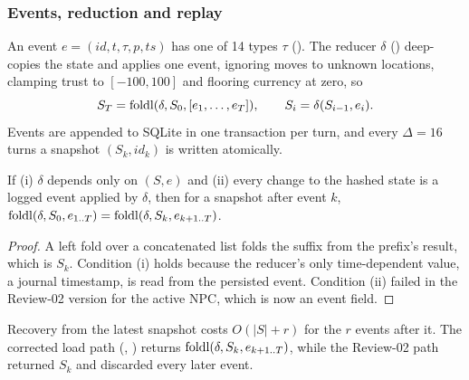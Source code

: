 \documentclass[letterpaper,journal]{IEEEtran}
\begin{document}
\subsubsection{Events, reduction and replay}
An event $e=(\mathit{id},t,\tau,p,\mathit{ts})$ has one of 14 types $\tau$ (). The reducer $\delta$ () deep-copies the state and applies one event, ignoring moves to unknown locations, clamping trust to $[-100,100]$ and flooring currency at zero, so
\begin{equation}\label{eq:fold}
S_{T}=\operatorname{foldl}(\delta,S_0,[e_1,\dots,e_T]),\qquad S_{i}=\delta(S_{i-1},e_i).
\end{equation}
Events are appended to SQLite in one transaction per turn, and every $\Delta=16$ turns a snapshot $(S_k,\mathit{id}_k)$ is written atomically.

\begin{proposition}\label{prop:replay}
If (i) $\delta$ depends only on $(S,e)$ and (ii) every change to the hashed state is a logged event applied by $\delta$, then for a snapshot after event $k$, $\operatorname{foldl}(\delta,S_0,e_{1..T})=\operatorname{foldl}(\delta,S_k,e_{k+1..T})$.
\end{proposition}
\begin{proof}
A left fold over a concatenated list folds the suffix from the prefix's result, which is $S_k$. Condition (i) holds because the reducer's only time-dependent value, a journal timestamp, is read from the persisted event. Condition (ii) failed in the Review-02 version for the active NPC, which is now an event field.
\end{proof}
Recovery from the latest snapshot costs $O(|S|+r)$ for the $r$ events after it. The corrected load path (, ) returns $\operatorname{foldl}(\delta,S_k,e_{k+1..T})$, while the Review-02 path returned $S_k$ and discarded every later event.
\end{document}
